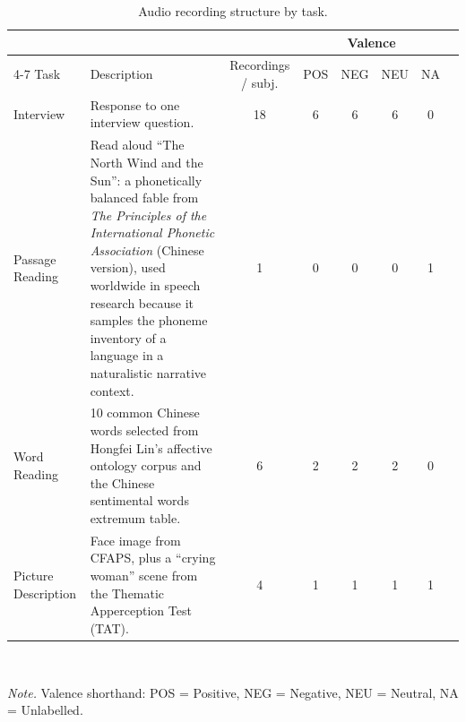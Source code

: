 \begin{table}[t]
\caption{Audio recording structure by task.}
\label{tab:audio-tasks}
\vskip 0.10in
\begin{center}
\begin{small}
\setlength{\tabcolsep}{6pt}
\begin{tabular}{lp{6.2cm}cccccc}
\toprule
                    &                                                   &                    & \multicolumn{4}{c}{Valence}                  \\
\cmidrule(lr){4-7}
Task                & Description                                       & Recordings / subj. & POS & NEG & NEU & NA \\
\midrule
Interview           & Response to one interview question.                                                                                                                                                                                                                                  & 18 & 6 & 6 & 6 & 0 \\
\addlinespace
Passage Reading     & Read aloud ``The North Wind and the Sun'': a phonetically balanced fable from \emph{The Principles of the International Phonetic Association} (Chinese version), used worldwide in speech research because it samples the phoneme inventory of a language in a naturalistic narrative context. & 1  & 0 & 0 & 0 & 1 \\
\addlinespace
Word Reading        & 10 common Chinese words selected from Hongfei Lin's affective ontology corpus and the Chinese sentimental words extremum table.                                                                                                                                       & 6  & 2 & 2 & 2 & 0 \\
\addlinespace
Picture Description & Face image from CFAPS, plus a ``crying woman'' scene from the Thematic Apperception Test (TAT).                                                                                                                                                                      & 4  & 1 & 1 & 1 & 1 \\
\bottomrule
\end{tabular}\\[2pt]
\begin{minipage}{\textwidth}
\footnotesize \emph{Note.} Valence shorthand: POS = Positive, NEG = Negative, NEU = Neutral, NA = Unlabelled.
\end{minipage}
\end{small}
\end{center}
\vskip -0.15in
\end{table}
